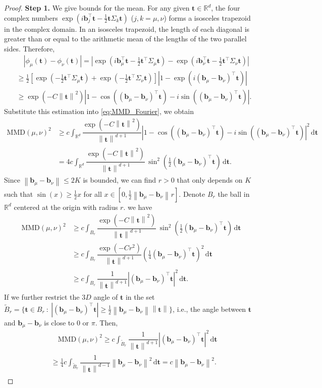 \documentclass{article} %
\theoremstyle{plain}
\theoremstyle{definition}
\theoremstyle{remark}
\newcommand{\R}{\mathbb{R}}
\newcommand{\norm}[2][H^s]{\left\|#2\right\|_{#1}}
\newcommand{\bt}{\mathbf{t}}
\newcommand{\bb}{\mathbf{b}}
\newcommand{\wt}{\widetilde}
\newcommand{\rd}{\mathrm{d}}
\newcommand{\MMD}{\mathrm{MMD}}
\newcommand{\tp}{^{\top}}
\newcommand{\parentheses}[1]{\left(#1\right)}
\newcommand{\sqbra}[1]{\left[#1\right]}
\newcommand{\abs}[1]{\left|#1\right|}
\begin{document}
\begin{proof}
\medskip\noindent
\textbf{Step 1.} We give bounds for the mean. For any given $\bt\in\R^d$, the four complex numbers $\exp\parentheses{i \bb_j\tp \bt - \frac12 \bt \Sigma_k \bt}$ ($j,k=\mu,\nu$) forms a isosceles trapezoid in the complex domain. In an isosceles trapezoid, the length of each diagonal is greater than or equal to the arithmetic mean of the lengths of the two parallel sides. Therefore,
\begin{align*}
& \quad \abs{\phi_\mu(\bt) - \phi_\nu(\bt)} = \abs{\exp\parentheses{i \bb_\mu\tp \bt - \frac12 \bt\tp \Sigma_\mu \bt} - \exp\parentheses{i \bb_\nu\tp \bt - \frac12 \bt\tp \Sigma_\nu \bt}}\\
& \ge \frac12 \sqbra{\exp\parentheses{- \frac12 \bt\tp \Sigma_\mu \bt} + \exp\parentheses{- \frac12 \bt\tp \Sigma_\nu \bt}} \abs{1 - \exp\parentheses{i(\bb_\mu-\bb_\nu)\tp \bt}} \\
& \ge \exp(-C\norm[]{\bt}^2) \abs{1 - \cos((\bb_\mu-\bb_\nu)\tp \bt) - i \sin((\bb_\mu-\bb_\nu)\tp \bt)}.
\end{align*}
Substitute this estimation into \eqref{eq:MMD_Fourier}, we obtain
\begin{align*}
\MMD(\mu,\nu)^2 & \ge c \int_{\R^d} \dfrac{\exp(-C\norm[]{\bt}^2)}{\norm[]{\bt}^{d+1}}  \abs{1 - \cos((\bb_\mu-\bb_\nu)\tp \bt) - i \sin((\bb_\mu-\bb_\nu)\tp \bt)}^2\,\rd \bt \\
& = 4c \int_{\R^d} \dfrac{\exp(-C\norm[]{\bt}^2)}{\norm[]{\bt}^{d+1}} \, \sin^2\parentheses{\frac12 (\bb_\mu-\bb_\nu)\tp \bt} \,\rd \bt.
\end{align*}
Since $\norm[]{\bb_\mu-\bb_\nu}\le 2K$ is bounded, we can find $r>0$ that only depends on $K$ such that $\sin(x) \ge \frac12 x$ for all $x \in [0, \frac12 \norm[]{\bb_\mu-\bb_\nu} r]$. Denote $B_r$ the ball in $\R^d$ centered at the origin with radius $r$. we have
\begin{align*}
\MMD(\mu,\nu)^2 
& \ge c \int_{B_r} \dfrac{\exp(-C\norm[]{\bt}^2)}{\norm[]{\bt}^{d+1}} \, \sin^2\parentheses{\frac12 (\bb_\mu-\bb_\nu)\tp \bt} \,\rd \bt \\
& \ge c \int_{B_r} \dfrac{\exp(-Cr^2)}{\norm[]{\bt}^{d+1}} \parentheses{\frac14 (\bb_\mu-\bb_\nu)\tp \bt}^2 \,\rd \bt \\
& \ge c \int_{B_r} \dfrac{1}{\norm[]{\bt}^{d+1}} \abs{(\bb_\mu-\bb_\nu)\tp \bt}^2 \,\rd \bt.
\end{align*}
If we further restrict the $3D$ angle of $\bt$ in the set $\wt{B}_r = \{ \bt\in B_r ~:~ |(\bb_\mu-\bb_\nu)\tp \bt| \ge \frac12 \norm[]{\bb_\mu-\bb_\nu} \norm[]{\bt} \}$, i.e., the angle between $\bt$ and $\bb_\mu-\bb_\nu$ is close to $0$ or $\pi$. Then,
\begin{align*}
& \quad \MMD(\mu,\nu)^2 \ge c \int_{\wt{B}_r} \dfrac{1}{\norm[]{\bt}^{d+1}} \abs{(\bb_\mu-\bb_\nu)\tp \bt}^2 \,\rd \bt\\
& \ge \frac14 c \int_{\wt{B}_r} \dfrac{1}{\norm[]{\bt}^{d-1}} \norm[]{\bb_\mu-\bb_\nu}^2 \,\rd \bt = c \norm[]{\bb_\mu-\bb_\nu}^2.
\end{align*}


\end{proof}
\end{document}
